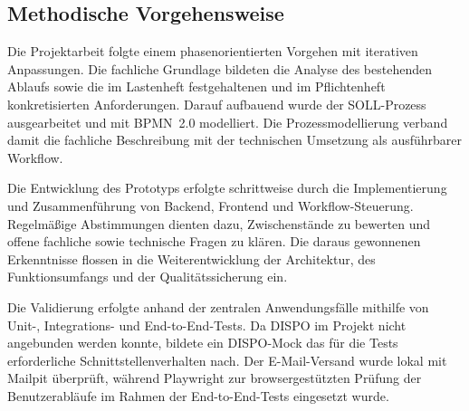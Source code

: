 \subsection{Methodische Vorgehensweise}

Die Projektarbeit folgte einem phasenorientierten Vorgehen mit
iterativen Anpassungen. Die fachliche Grundlage bildeten die
Analyse des bestehenden Ablaufs sowie die im Lastenheft
festgehaltenen und im Pflichtenheft konkretisierten
Anforderungen. Darauf aufbauend wurde der SOLL-Prozess
ausgearbeitet und mit BPMN~2.0 modelliert. Die Prozessmodellierung
verband damit die fachliche Beschreibung mit der technischen
Umsetzung als ausführbarer Workflow.

Die Entwicklung des Prototyps erfolgte schrittweise durch die
Implementierung und Zusammenführung von Backend, Frontend und
Workflow-Steuerung. Regelmäßige Abstimmungen dienten dazu,
Zwischenstände zu bewerten und offene fachliche sowie technische
Fragen zu klären. Die daraus gewonnenen Erkenntnisse flossen
in die Weiterentwicklung der Architektur, des Funktionsumfangs
und der Qualitätssicherung ein.

Die Validierung erfolgte anhand der zentralen Anwendungsfälle
mithilfe von Unit-, Integrations- und End-to-End-Tests.
Da DISPO im Projekt nicht angebunden werden
konnte, bildete ein DISPO-Mock das für die Tests erforderliche
Schnittstellenverhalten nach. Der E-Mail-Versand wurde lokal
mit Mailpit überprüft, während Playwright zur
browsergestützten Prüfung der Benutzerabläufe im Rahmen
der End-to-End-Tests eingesetzt wurde.